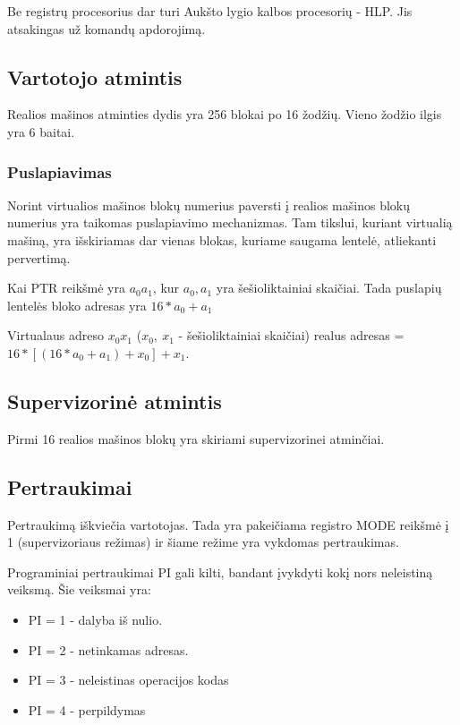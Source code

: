 \documentclass{VUMIFInfKursinis}
\begin{document}
Be registrų procesorius dar turi Aukšto lygio kalbos procesorių - HLP. Jis atsakingas už komandų apdorojimą.

\subsection{Vartotojo atmintis}

Realios mašinos atminties dydis yra 256 blokai po 16 žodžių. Vieno žodžio ilgis yra 6 baitai.

\subsubsection{Puslapiavimas}

Norint virtualios mašinos blokų numerius paversti į realios mašinos blokų numerius yra taikomas puslapiavimo mechanizmas. Tam tikslui, kuriant virtualią mašiną, yra išskiriamas dar vienas blokas, kuriame saugama lentelė, atliekanti pervertimą.

Kai PTR reikšmė yra $a_0a_1$, kur $a_0, a_1$ yra šešioliktainiai skaičiai. Tada puslapių lentelės bloko adresas yra $16 * a_0 + a_1$  

Virtualaus adreso $x_0x_1$ ($x_0, \ x_1$ - šešioliktainiai skaičiai) realus adresas = $16 * [(16 * a_0 + a_1) + x_0] + x_1$.

\subsection{Supervizorinė atmintis}

Pirmi 16 realios mašinos blokų yra skiriami supervizorinei atminčiai.

\subsection{Pertraukimai}

Pertraukimą iškviečia vartotojas. Tada yra pakeičiama registro MODE reikšmė į 1 (supervizoriaus režimas) ir šiame režime yra vykdomas pertraukimas. 

Programiniai pertraukimai PI gali kilti, bandant įvykdyti kokį nors neleistiną veiksmą. Šie veiksmai yra:

\begin{itemize}
	\item PI = 1 - dalyba iš nulio.
	\item PI = 2 - netinkamas adresas.
	\item PI = 3 - neleistinas operacijos kodas
	\item PI = 4 - perpildymas
\end{itemize}
\end{document}
